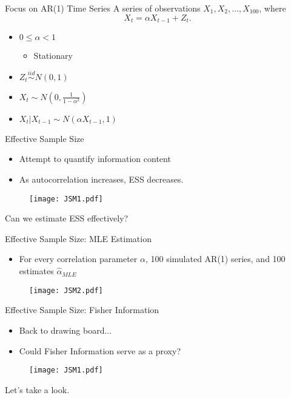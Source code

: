 \documentclass{beamer}
\begin{document}
\begin{frame}{Focus on AR(1) Time Series}  %
A series of observations $X_{1}, X_{2}, \dots, X_{100}$, where
{\huge $$X_{t} = \alpha X_{t-1} + Z_{t}. $$}

\begin{itemize}
\item $0 \leq \alpha < 1$
	\begin{itemize}
	\item Stationary
	\end{itemize}
\item $Z_{t} \stackrel{iid}{\sim} N(0,1)$
\item  $X_{t} \sim N\left(0, \frac{1}{1-\alpha^{2}}\right)$
\item $X_{t}|X_{t-1} \sim N\left(\alpha X_{t-1}, 1 \right) $
\end{itemize}
\end{frame}

\begin{frame}{Effective Sample Size}  %

\begin{itemize}
\item Attempt to quantify information content
\item As autocorrelation increases, ESS decreases.
\end{itemize}

\begin{figure}
\centering
\texttt{[image: JSM1.pdf]}
\end{figure}

Can we estimate ESS effectively?

\end{frame}


\begin{frame}{Effective Sample Size: MLE Estimation}  %
\begin{itemize}
\item For every correlation parameter $\alpha$, 100 simulated AR(1) series, and 100 estimates $\hat{\alpha}_{MLE}$
\end{itemize}

\begin{figure}
\centering
\texttt{[image: JSM2.pdf]}
\end{figure}

\cite{IEESS}

\end{frame}

\begin{frame}{Effective Sample Size: Fisher Information}  %
\begin{itemize}
\item Back to drawing board...
\item Could Fisher Information serve as a proxy?
\end{itemize}

\begin{figure}
\centering
\texttt{[image: JSM1.pdf]}
\end{figure}

Let's take a look.

\end{frame}
\end{document}
